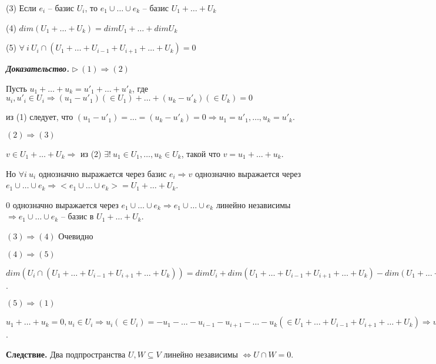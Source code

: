 (3) Если $e_i$ -- базис $U_i$, то $e_1 \cup \dots \cup e_k$ -- базис $U_1 + \dots + U_k$

(4) $dim(U_1 + \dots + U_k) = dim U_1 + \dots + dim U_k$

(5) $\forall \ i \ U_i \cap (U_1 + \dots + U_{i-1} + U_{i+1} + \dots + U_k) = 0$

\bigskip
\textbf{\textit{Доказательство.}} $\rhd \ (1) \Rightarrow (2)$ 

Пусть $u_1 + \dots + u_k = u'_1 + \dots + u'_k$, где $u_i, u'_i \in U_i \Rightarrow (u_1 - u'_1) (\in U_1) + \dots + (u_k - u'_k) (\in U_k) = 0$

из (1) следует, что $(u_1 - u'_1) = \dots = (u_k - u'_k) = 0 \Rightarrow u_1 = u'_1, \dots, u_k = u'_k$.

\bigskip
$(2) \Rightarrow (3)$

$v \in U_1 + \dots + U_k \Rightarrow$ из (2) $\exists! \ u_1 \in U_1, \dots, u_k \in U_k$, такой что $v = u_1 + \dots + u_k$.

Но $\forall i \ u_i$ однозначно выражается через базис $e_i \Rightarrow v$ однозначно выражается через $e_1 \cup \dots \cup e_k \Rightarrow <e_1 \cup \dots \cup e_k> = U_1 + \dots + U_k$.

0 однозначно выражается через $e_1 \cup \dots \cup e_k \Rightarrow e_1 \cup \dots \cup e_k$ линейно независимы $\Rightarrow e_1 \cup \dots \cup e_k$ -- базис в $U_1 + \dots + U_k$.

\bigskip
$(3) \Rightarrow (4)$ Очевидно

\bigskip
$(4) \Rightarrow (5)$

$dim (U_i \cap (U_1 + \dots + U_{i-1} + U_{i+1} + \dots + U_k)) = dimU_i + dim(U_1 + \dots + U_{i-1} + U_{i+1} + \dots + U_k) - dim (U_1 + \dots + U_k) \leq dimU_i + dim U_1 + \dots + dimU_{i-1} + dimU_{i+1} + \dots + dimU_k - (dim U_1 + \dots + dim U_k) = 0 \Rightarrow dim(U_i \cap (U_1 + \dots + U_{i-1} + U_{i+1} + \dots + U_k)) = 0 \Rightarrow U_i \cap (U_1 + \dots + U_{i-1} + U_{i+1} + \dots + U_k) = 0$.

\bigskip
$(5) \Rightarrow (1)$

$u_1 + \dots + u_k = 0, u_i \in U_i \Rightarrow u_i (\in U_i) = -u_1 - \dots - u_{i-1} - u_{i+1} - \dots - u_k (\in U_1 + \dots + U_{i-1} + U_{i + 1} + \dots + U_k) \Rightarrow u_i \in U_i \cap (U_1 + \dots + U_{i-1} + U_{i+1} + \dots + U_k) \lhd$.

\bigskip
\textbf{Следствие.} Два подпространства $U, W \subseteq V$ линейно независимы $\Leftrightarrow U \cap W = 0$.

